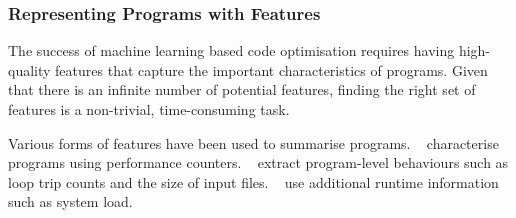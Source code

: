 \subsubsection{Representing Programs with Features}

The success of machine learning based code optimisation requires having high-quality features that capture the important characteristics of programs. Given that there is an infinite number of potential features, finding the right set of features is a non-trivial, time-consuming task.

Various forms of features have been used to summarise programs.
\citeauthor{Dubach2009}~\cite{Dubach2009} characterise programs using performance counters.
\citeauthor{Jiang2010}~\cite{Jiang2010} extract program-level behaviours such as loop trip counts and the size of input files.
\citeauthor{Berral2010a}~\cite{Berral2010a} use additional runtime information such as system load.


